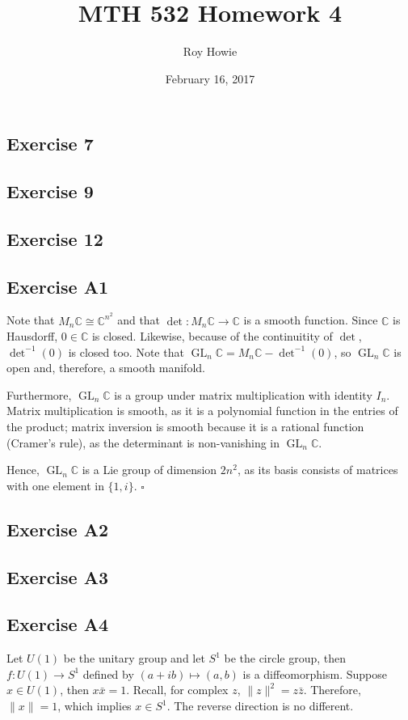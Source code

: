 \documentclass{article}
\newcommand{\C}{\mathbb{C}}
\DeclareMathOperator{\GL}{GL}
\begin{document}
\title{MTH 532 Homework 4}
\author{Roy Howie}
\date{February 16, 2017}
\maketitle

\subsection*{Exercise 7}
\subsection*{Exercise 9}
\subsection*{Exercise 12}
\subsection*{Exercise A1}
  Note that $M_n\C\cong\C^{n^2}$ and that $\det\colon M_n\C\to\C$ is a smooth
  function. Since $\C$ is Hausdorff, $0\in\C$ is closed. Likewise, because of
  the continuitity of $\det$, $\det^{-1}(0)$ is closed too. Note that $\GL_n\C=
  M_n\C-\det^{-1}(0)$, so $\GL_n\C$ is open and, therefore, a smooth manifold.

  Furthermore, $\GL_n\C$ is a group under matrix multiplication with identity
  $I_n$. Matrix multiplication is smooth, as it is a polynomial function in the
  entries of the product; matrix inversion is smooth because it is a rational
  function (Cramer's rule), as the determinant is non-vanishing in $\GL_n\C$.

  Hence, $\GL_n\C$ is a Lie group of dimension $2n^2$, as its basis consists of
  matrices with one element in $\{1,i\}$.
  \hfill $\square$

\subsection*{Exercise A2}
\subsection*{Exercise A3}
\subsection*{Exercise A4}
  Let $U(1)$ be the unitary group and let $S^1$ be the circle group, then $f
  \colon U(1)\to S^1$ defined by $(a+ib)\mapsto (a,b)$ is a diffeomorphism.
  Suppose $x\in U(1)$, then $x\bar{x}=1$. Recall, for complex $z$, $\|z\|^2=z
  \bar{z}$. Therefore, $\|x\| = 1$, which implies $x\in S^1$. The reverse
  direction is no different.
\end{document}
